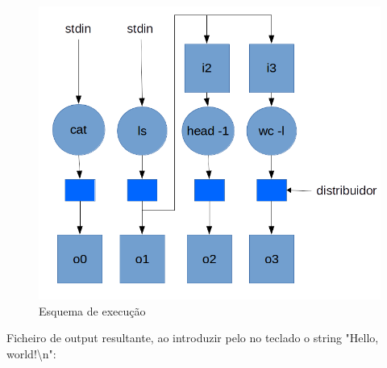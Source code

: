 \documentclass[12pt]{report}
\begin{document}
\begin{figure}
    \includegraphics[width=\linewidth]{esquema_execucao_exemplo.png}
    \caption{Esquema de execução}
    \label{fig:esquema_execucao}
\end{figure}

\noindent Ficheiro de output resultante, ao introduzir pelo no teclado o string "Hello, world!\textbackslash n":
\end{document}
